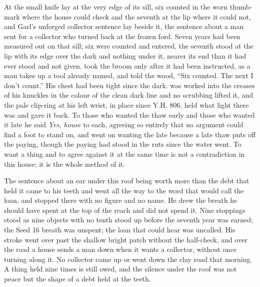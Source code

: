\scenebreak

At  the small knife lay at the very edge of its sill, six counted in the worn thumb-mark where the house could check and the seventh at the lip where it could not, and Garl's unforged collector sentence lay beside it, the sentence about a man sent for a collector who turned back at the frozen ford. Seven years had been measured out on that sill; six were counted and entered, the seventh stood at the lip with its edge over the dark and nothing under it, nearer its end than it had ever stood and not given.  took the broom only after it had been instructed, as a man takes up a tool already named, and told the wood, “Six counted. The next I don't count.” His chest had been tight since the dark.  was worked into the creases of his knuckles in the colour of the clean dark line and no scrubbing lifted it, and the pale clip-ring at his left wrist, in place since Y.H. 806, held what light there was and gave it back. To those who wanted the thaw early and those who wanted it late he said \emph{Yes, house} to each, agreeing so entirely that no argument could find a foot to stand on, and went on wanting the late because a late thaw puts off the paying, though the paying had stood in the ruts since the water went. To want a thing and to agree against it at the same time is not a contradiction in this house; it is the whole method of it.

The sentence about an ear under this roof being worth more than the debt that held it came to his teeth and went all the way to the word that would call the loan, and stopped there with no figure and no name. He drew the breath he should have spent at the top of the reach and did not spend it. Nine stoppings stood as nine objects with no tenth stood up before the seventh year was earned; the Seed 16 breath was unspent; the loan that could hear was uncalled. His stroke went over  past the shallow bright patch without the half-check, and over the road a house sends a man down when it wants a collector, without once turning along it. No collector came up or went down the clay road that morning. A thing held nine times is still owed, and the silence under the roof was not peace but the shape of a debt held at the teeth.

\scenebreak

